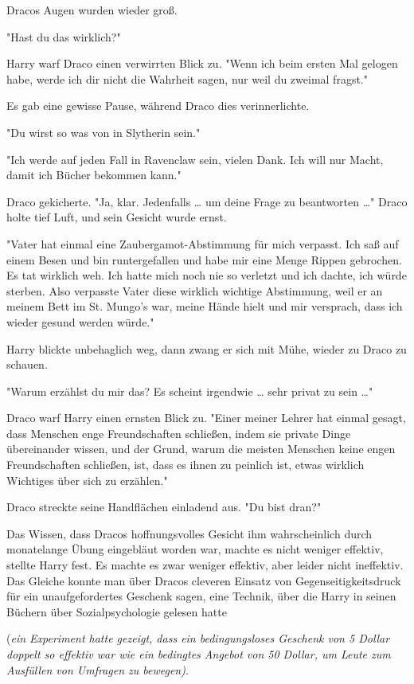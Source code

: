 {Dracos Augen wurden wieder groß.

"Hast du das wirklich?"

Harry warf Draco einen verwirrten Blick zu. "Wenn ich beim ersten Mal gelogen habe, werde ich dir nicht die Wahrheit sagen, nur weil du zweimal fragst."

Es gab eine gewisse Pause, während Draco dies verinnerlichte.

"Du wirst so was von in Slytherin sein."

"Ich werde auf jeden Fall in Ravenclaw sein, vielen Dank. Ich will nur Macht, damit ich Bücher bekommen kann."

Draco gekicherte. "Ja, klar. Jedenfalls … um deine Frage zu beantworten …" Draco holte tief Luft, und sein Gesicht wurde ernst.

"Vater hat einmal eine Zaubergamot-Abstimmung für mich verpasst. Ich saß auf einem Besen und bin runtergefallen und habe mir eine Menge Rippen gebrochen. Es tat wirklich weh. Ich hatte mich noch nie so verletzt und ich dachte, ich würde sterben. Also verpasste Vater diese wirklich wichtige Abstimmung, weil er an meinem Bett im St. Mungo's war, meine Hände hielt und mir versprach, dass ich wieder gesund werden würde."

Harry blickte unbehaglich weg, dann zwang er sich mit Mühe, wieder zu Draco zu schauen.

"Warum erzählst du mir das? Es scheint irgendwie … sehr privat zu sein …"

Draco warf Harry einen ernsten Blick zu. "Einer meiner Lehrer hat einmal gesagt, dass Menschen enge Freundschaften schließen, indem sie private Dinge übereinander wissen, und der Grund, warum die meisten Menschen keine engen Freundschaften schließen, ist, dass es ihnen zu peinlich ist, etwas wirklich Wichtiges über sich zu erzählen."

Draco streckte seine Handflächen einladend aus. "Du bist dran?"

Das Wissen, dass Dracos hoffnungsvolles Gesicht ihm wahrscheinlich durch monatelange Übung eingebläut worden war, machte es nicht weniger effektiv, stellte Harry fest. Es machte es zwar weniger effektiv, aber leider nicht ineffektiv. Das Gleiche konnte man über Dracos cleveren Einsatz von Gegenseitigkeitsdruck für ein unaufgefordertes Geschenk sagen, eine Technik, über die Harry in seinen Büchern über Sozialpsychologie gelesen hatte

(\emph{ein Experiment hatte gezeigt, dass ein bedingungsloses Geschenk von 5 Dollar doppelt so effektiv war wie ein bedingtes Angebot von 50 Dollar, um Leute zum Ausfüllen von Umfragen zu bewegen)}.

}
